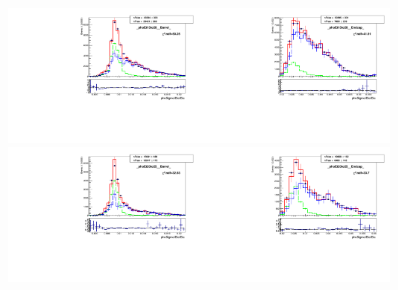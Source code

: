 \begin{figure}[htb]
  \begin{center}
   \includegraphics[width=0.45\textwidth]{../figs/figs_v11/MUON_WGamma/TemplateFits/c_TEMPL_SIHIH_UNblind__phoEt15to20__Barrel__RooFit.pdf}\includegraphics[width=0.45\textwidth]{../figs/figs_v11/MUON_WGamma/TemplateFits/c_TEMPL_SIHIH_UNblind__phoEt15to20__Endcap__RooFit.pdf}\\
   \includegraphics[width=0.45\textwidth]{../figs/figs_v11/MUON_WGamma/TemplateFits/c_TEMPL_SIHIH_UNblind__phoEt20to25__Barrel__RooFit.pdf}\includegraphics[width=0.45\textwidth]{../figs/figs_v11/MUON_WGamma/TemplateFits/c_TEMPL_SIHIH_UNblind__phoEt20to25__Endcap__RooFit.pdf}\\

\end{center}
\end{figure}
